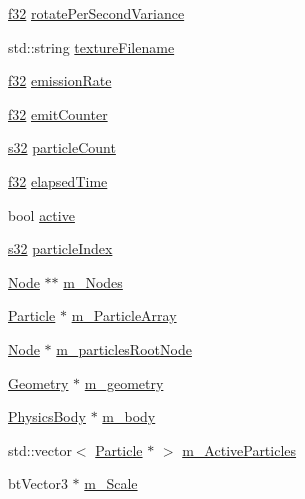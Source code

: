 \begin{DoxyCompactItemize}
\item 
\mbox{\hyperlink{_util_8h_a5f6906312a689f27d70e9d086649d3fd}{f32}} \mbox{\hyperlink{classnjli_1_1_particle_emitter_a3dee0bb7b8e995da5aa84638dfa95f16}{rotate\+Per\+Second\+Variance}}
\item 
std\+::string \mbox{\hyperlink{classnjli_1_1_particle_emitter_abcf96d8ca5dff9419dc52a4641e485e5}{texture\+Filename}}
\item 
\mbox{\hyperlink{_util_8h_a5f6906312a689f27d70e9d086649d3fd}{f32}} \mbox{\hyperlink{classnjli_1_1_particle_emitter_aa0e025068c468db0c7ab07aeeefc9339}{emission\+Rate}}
\item 
\mbox{\hyperlink{_util_8h_a5f6906312a689f27d70e9d086649d3fd}{f32}} \mbox{\hyperlink{classnjli_1_1_particle_emitter_ae3e31b529fa8649e94b6a88a5b869598}{emit\+Counter}}
\item 
\mbox{\hyperlink{_util_8h_aa62c75d314a0d1f37f79c4b73b2292e2}{s32}} \mbox{\hyperlink{classnjli_1_1_particle_emitter_ad183b3502dc1030b90a251ed6c1e68c9}{particle\+Count}}
\item 
\mbox{\hyperlink{_util_8h_a5f6906312a689f27d70e9d086649d3fd}{f32}} \mbox{\hyperlink{classnjli_1_1_particle_emitter_a1ff6d5612c496bfbaadeb8ee443936c8}{elapsed\+Time}}
\item 
bool \mbox{\hyperlink{classnjli_1_1_particle_emitter_a905024b9c36077de686cdf193729821e}{active}}
\item 
\mbox{\hyperlink{_util_8h_aa62c75d314a0d1f37f79c4b73b2292e2}{s32}} \mbox{\hyperlink{classnjli_1_1_particle_emitter_a85626d66e4f909bb841b80d0c5ba7a91}{particle\+Index}}
\item 
\mbox{\hyperlink{classnjli_1_1_node}{Node}} $\ast$$\ast$ \mbox{\hyperlink{classnjli_1_1_particle_emitter_a1e7b14808dedeb9a8729c7b841a7f8d9}{m\+\_\+\+Nodes}}
\item 
\mbox{\hyperlink{structnjli_1_1_particle_emitter_1_1_particle}{Particle}} $\ast$ \mbox{\hyperlink{classnjli_1_1_particle_emitter_a46aac8923bcce6d1c12476f219578ec0}{m\+\_\+\+Particle\+Array}}
\item 
\mbox{\hyperlink{classnjli_1_1_node}{Node}} $\ast$ \mbox{\hyperlink{classnjli_1_1_particle_emitter_ab42b939953c9056096190d640bf393a6}{m\+\_\+particles\+Root\+Node}}
\item 
\mbox{\hyperlink{classnjli_1_1_geometry}{Geometry}} $\ast$ \mbox{\hyperlink{classnjli_1_1_particle_emitter_ac2d3c693bbd8ea55439070800b89b215}{m\+\_\+geometry}}
\item 
\mbox{\hyperlink{classnjli_1_1_physics_body}{Physics\+Body}} $\ast$ \mbox{\hyperlink{classnjli_1_1_particle_emitter_a5cde7769e5298dd82098e0bd83d89808}{m\+\_\+body}}
\item 
std\+::vector$<$ \mbox{\hyperlink{structnjli_1_1_particle_emitter_1_1_particle}{Particle}} $\ast$ $>$ \mbox{\hyperlink{classnjli_1_1_particle_emitter_a0fcf8fb984e5c2af28afd8f539e2ba5b}{m\+\_\+\+Active\+Particles}}
\item 
bt\+Vector3 $\ast$ \mbox{\hyperlink{classnjli_1_1_particle_emitter_aec08a338a0ff997d54a591dcf20e5db2}{m\+\_\+\+Scale}}
\end{DoxyCompactItemize}
